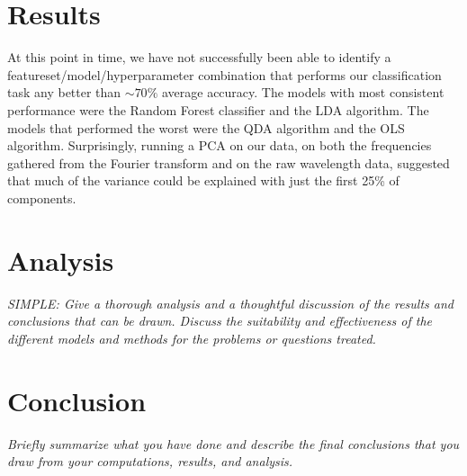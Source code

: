 \documentclass[10pt,letterpaper]{article}
\begin{document}
\section{Results}
At this point in time, we have not successfully been able to identify a featureset/model/hyperparameter combination that performs our classification task any better than $\sim70\%$ average accuracy. The models with most consistent performance were the Random Forest classifier and the LDA algorithm. The models that performed the worst were the QDA algorithm and the OLS algorithm.
Surprisingly, running a PCA on our data, on both the frequencies gathered from the Fourier transform and on the raw wavelength data, suggested that much of the variance could be explained with just the first 25\% of components.

\section{Analysis}
\textit{SIMPLE: Give a thorough analysis and a thoughtful discussion of the results and conclusions that can be drawn. Discuss the suitability and effectiveness of the different models and methods for the problems or questions treated.}

\section{Conclusion}
\textit{Briefly summarize what you have done and describe the final conclusions that you draw from your computations, results, and analysis.}
\end{document}
